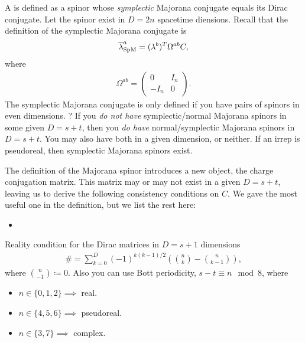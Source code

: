 \documentclass[11pt]{article}
\begin{document}
\begin{definition}
    A  is defined as a spinor
    whose \emph{symplectic} Majorana conjugate equals its Dirac conjugate.
    Let the spinor exist in $D = 2n$ spacetime diensions.
    Recall that the definition of the symplectic Majorana conjugate is
    \begin{align*}
        \bar{\lambda}_{\rm SpM}^a = (\lambda^b)^T \Omega^{ab} C,
    \end{align*}
    where
    \begin{align*}
        \Omega^{ab} = \begin{pmatrix}
            0 & I_n\\
            - I_n & 0
        \end{pmatrix}.
    \end{align*}
    The symplectic Majorana conjugate is only defined if you have
    pairs of spinors in even dimensions. ?
    If you \emph{do not have} symplectic/normal Majorana
    spinors in some given $D = s + t$, then you \emph{do
    have} normal/symplectic Majorana spinors in $D = s + t$.
    You may also have both in a given dimension, or neither.
    If an irrep is pseudoreal, then symplectic Majorana spinors
    exist.
\end{definition}

The definition of the Majorana spinor introduces a new object,
the charge conjugation matrix. This matrix may or may not exist
in a given $D = s + t$, leaving us to derive the following consistency
conditions on $C$. We gave the most useful one in the definition,
but we list the rest here:
\begin{itemize}
    \item {}
\end{itemize}


Reality condition for the Dirac matrices in $D = s + 1$
dimensions
\begin{align*}
    \# = \sum_{k = 0}^D (-1)^{k(k - 1)/2} \left( {n \choose k} - {n \choose k - 1} \right),
\end{align*}
where ${n \choose - 1} \coloneqq 0$. Also you can use
Bott periodicity, $s - t \equiv n \mod 8$, where
\begin{itemize}
    \item $n \in \{ 0, 1, 2 \} \implies $ real.
    \item $n \in \{ 4, 5, 6 \} \implies $ pseudoreal.
    \item $n \in \{ 3, 7 \} \implies $ complex.
\end{itemize}
\end{document}
